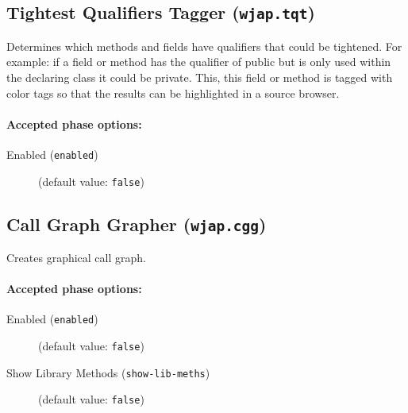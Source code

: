 \documentclass{article}
\begin{document}
\subsection{Tightest Qualifiers Tagger ({\tt wjap.tqt})}

\par
Determines which methods and fields have qualifiers that could be tightened. For example: if a field or method has the qualifier of public but is only used within the declaring class it could be private. This, this field or method is tagged with color tags so that the results can be highlighted in a source browser.

\paragraph{Accepted phase options:} 

\begin{description}

\item[Enabled ({\tt enabled})]
(default value: {\tt false})






\end{description}

\subsection{Call Graph Grapher ({\tt wjap.cgg})}

\par
Creates graphical call graph.

\paragraph{Accepted phase options:} 

\begin{description}

\item[Enabled ({\tt enabled})]
(default value: {\tt false})






\item[Show Library Methods ({\tt show-lib-meths})]
(default value: {\tt false})






\end{description}
\end{document}
